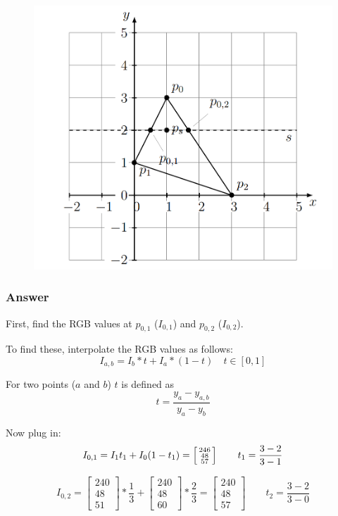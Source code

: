 \documentclass[a4paper,10pt]{article}
\begin{document}
\begin{figure}[H]
    \centering
    \includegraphics[width=0.6\linewidth]{old-exercise-shading.png} 
\end{figure}

\subsubsection{Answer}
First, find the RGB values at $p_{0,1}$ ($I_{0,1}$) and $p_{0,2}$ ($I_{0,2}$).

To find these, interpolate the RGB values as follows:
$$ I_{a,b} = I_{b}*t + I_{a}*(1-t) \quad t \in [0,1] $$

For two points ($a$ and $b$) $t$ is defined as
$$ t = \frac{ y_{a}-y_{a,b} }{ y_{a}-y_{b}} $$

Now plug in: $$
I_{0,1} = I_{1}t_{1} + I_{0}(1-t_{1}) = \left[\begin{smallmatrix}
246  \\
48 \\
57
\end{smallmatrix}\right] \\ \qquad t_{1} = \frac{3-2}{3-1} 
$$

$$  
I_{0,2} = \left[\begin{smallmatrix}
240  \\
48 \\
51
\end{smallmatrix}\right] * \frac{1}{3} + \left[\begin{smallmatrix}
240  \\
48 \\
60
\end{smallmatrix}\right] * \frac{2}{3} = \left[\begin{smallmatrix}
240  \\
48 \\
57
\end{smallmatrix}\right] \qquad t_{2} = \frac{3-2}{3-0}
$$
\end{document}

